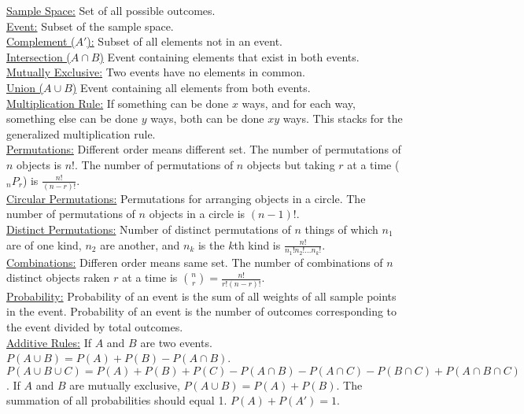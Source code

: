 \documentclass[9pt]{article}
\begin{document}
        \begin{multicols}{2}
            \noindent\underline{Sample Space:} Set of all possible outcomes.\\
            \underline{Event:} Subset of the sample space.\\
            \underline{Complement ($A'$):} Subset of all elements not in an event.\\
            \underline{Intersection ($A\cap B$)} Event containing elements that exist in both events.\\
            \underline{Mutually Exclusive:} Two events have no elements in common.\\
            \underline{Union ($A\cup B$)} Event containing all elements from both events.\\
            \underline{Multiplication Rule:} If something can be done $x$ ways, and for each way, something else can be done $y$ ways, both can be done $xy$ ways. This stacks for the generalized multiplication rule.\\
            \underline{Permutations:} Different order means different set. The number of permutations of $n$ objects is $n!$. The number of permutations of $n$ objects but taking $r$ at a time ($_nP_r$) is $\frac{n!}{(n-r)!}$.\\
            \underline{Circular Permutations:} Permutations for arranging objects in a circle. The number of permutations of $n$ objects in a circle is $(n-1)!$.\\
            \underline{Distinct Permutations:} Number of distinct permutations of $n$ things of which $n_1$ are of one kind, $n_2$ are another, and $n_k$ is the $k$th kind is $\frac{n!}{n_1!n_2!...n_k!}$.\\
            \underline{Combinations:} Differen order means same set. The number of combinations of $n$ distinct objects raken $r$ at a time is $\binom{n}{r} = \frac{n!}{r!(n-r)!}$.\\
            \underline{Probability:} Probability of an event is the sum of all weights of all sample points in the event. Probability of an event is the number of outcomes corresponding to the event divided by total outcomes.\\
            \underline{Additive Rules:} If $A$ and $B$ are two events. $P(A\cup B) = P(A) + P(B) - P(A\cap B)$. $P(A\cup B\cup C) = P(A)+P(B)+P(C)-P(A\cap B) - P(A\cap C) - P(B\cap C) + P(A\cap B\cap C)$. If $A$ and $B$ are mutually exclusive, $P(A\cup B) = P(A) + P(B)$. The summation of all probabilities should equal 1. $P(A) + P(A') = 1$.\\

\end{multicols}
\end{document}
